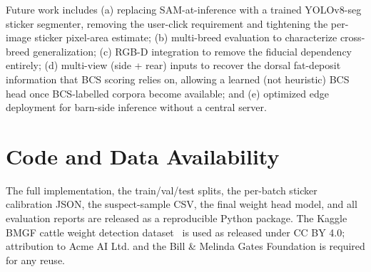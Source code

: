 \documentclass[conference]{IEEEtran}
\begin{document}
Future work includes (a) replacing SAM-at-inference with a trained YOLOv8-seg sticker segmenter, removing the user-click requirement and tightening the per-image sticker pixel-area estimate; (b) multi-breed evaluation to characterize cross-breed generalization; (c) RGB-D integration to remove the fiducial dependency entirely; (d) multi-view (side + rear) inputs to recover the dorsal fat-deposit information that BCS scoring relies on, allowing a learned (not heuristic) BCS head once BCS-labelled corpora become available; and (e) optimized edge deployment for barn-side inference without a central server.

\section*{Code and Data Availability}

The full implementation, the train/val/test splits, the per-batch sticker calibration JSON, the suspect-sample CSV, the final weight head model, and all evaluation reports are released as a reproducible Python package. The Kaggle BMGF cattle weight detection dataset~\cite{kaggle_acme_bmgf} is used as released under CC BY 4.0; attribution to Acme AI Ltd. and the Bill \& Melinda Gates Foundation is required for any reuse.
\end{document}
